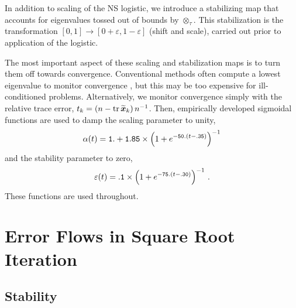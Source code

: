 \documentclass[letterpaper,twocolumn,amsmath,amsfont,amssymb,english,aps,jcp,preprintnumbers,groupaddress,nofootinbib,tightenlines,floatfix]{revtex4}
\newcommand{\mat}[1]{\boldsymbol{#1}}
\newcommand{\ot}{  {\scriptstyle \otimes}_{ \tau } }
\theoremstyle{plain}
\theoremstyle{remark}
\theoremstyle{plain}
\begin{document}
In addition to scaling of the NS logistic, we introduce a stabilizing map that accounts for eigenvalues 
tossed out of bounds by $\ot$. This stabilization is the transformation $[0,1] \rightarrow [0+\varepsilon, 1-\varepsilon]$
(shift and scale), carried out prior to application of the logistic.   

The most important aspect of these scaling and stabilization maps is to turn them off towards convergence.  Conventional methods 
often compute a lowest eigenvalue to monitor convergence \cite{Pan1991,chen2014}, but this may be too expensive for ill-conditioned problems. 
Alternatively, we monitor convergence simply with the relative trace error, 
$t_k = \left( n - {\rm tr} \, \widetilde{\mat{x}}_k \right) n^{-1}$.  
Then, empirically developed sigmoidal functions are used to damp the scaling parameter to unity, 
\begin{equation}
\alpha(t) = {\tt 1.} + {\tt 1.85}  \times \left( 1+e^{-{\tt 50.}(t-{\tt .35})}  \right)^{-1} 
\end{equation}
and the stability parameter to zero, 
\begin{equation}
\varepsilon(t) = {\tt .1} \times \left( 1+e^{-{\tt 75.}(t-{\tt .30})}  \right)^{-1} \, .
\end{equation}
These functions are used throughout. 

\section{Error Flows in Square Root Iteration}

\subsection{Stability}

\end{document}
